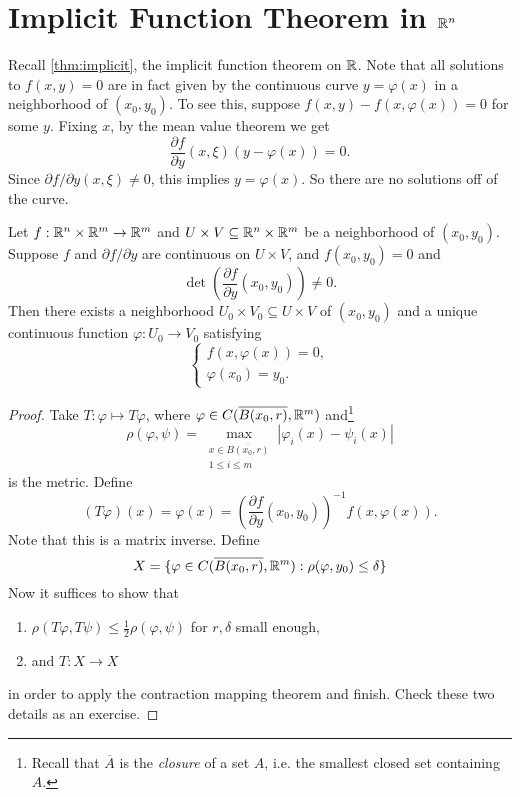 \section{Implicit Function Theorem in \texorpdfstring{$\mathbb{R}^n$}{Rn}}

\begin{remark}
  Recall \ref{thm:implicit}, the implicit function
  theorem on $\mathbb{R}$. Note that all solutions to $f(x, y) = 0$
  are in fact given by the continuous curve $y = \varphi(x)$
  in a neighborhood of $(x_0, y_0)$. To see this,
  suppose $f(x, y) - f(x, \varphi(x)) = 0$ for some $y$.
  Fixing $x$, by the mean value theorem we get
  \[
    \frac{\partial f}{\partial y}(x, \xi) (y - \varphi(x))
    = 0.
  \]
  Since $\partial f / \partial y(x, \xi) \ne 0$, this implies $y = \varphi(x)$.
  So there are no solutions off of the curve.
\end{remark}

\begin{theorem}
  Let $f : \mathbb{R}^n \times \mathbb{R}^m \to \mathbb{R}^m$ and
  $U \times V \subseteq \mathbb{R}^n \times \mathbb{R}^m$ be a neighborhood
  of $(x_0, y_0)$. Suppose $f$ and $\partial f / \partial y$
  are continuous on $U \times V$, and $f(x_0, y_0) = 0$ and
  \[
    \det \left( \frac{\partial f}{\partial y}(x_0, y_0) \right) \ne 0.
  \]
  Then there exists a neighborhood $U_0 \times V_0 \subseteq U \times V$
  of $(x_0, y_0)$ and a unique continuous function
  $\varphi : U_0 \to V_0$ satisfying
  \[
  \begin{cases}
    f(x, \varphi(x)) = 0, \\
    \varphi(x_0) = y_0.
  \end{cases}
  \]
\end{theorem}

\begin{proof}
  Take $T : \varphi \mapsto T\varphi$, where
  $\varphi \in C(\overline{B(x_0, r)}, \mathbb{R}^m)$ and\footnote{Recall that $\overline{A}$ is the \emph{closure} of a set $A$, i.e. the smallest closed set containing $A$.}
  \[
    \rho(\varphi, \psi) = \max_{\substack{x \in \overline{B(x_0, r)} \\ 1 \le i \le m}} |\varphi_i(x) - \psi_i(x)|
  \]
  is the metric.
  Define
  \[
    (T\varphi)(x) = \varphi(x) = \left( \frac{\partial f}{\partial y}(x_0, y_0) \right)^{-1} f(x, \varphi(x)).
  \]
  Note that this is a matrix inverse.
  Define
  \[
    X = \{
      \varphi \in C(\overline{B(x_0, r)}, \mathbb{R}^m)
      : \rho(\varphi, y_0) \le \delta
    \}
  \]
  Now it suffices to show that
  \begin{enumerate}
    \item $\rho(T\varphi, T\psi) \le \frac{1}{2} \rho(\varphi, \psi)$ for $r, \delta$ small enough,
    \item and $T : X \to X$
  \end{enumerate}
  in order to apply the contraction mapping theorem and
  finish. Check these two details as an exercise.
\end{proof}

